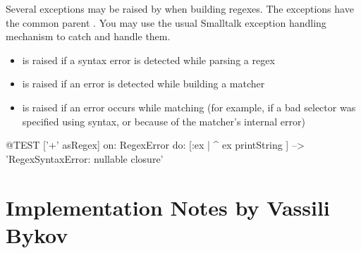 \documentclass[a4paper,10pt,twoside]{book}
\begin{document}
{Several exceptions may be raised by  when building regexes.  The exceptions have the common parent .  You may use the usual Smalltalk exception handling mechanism to catch and handle them.

\begin{itemize}

\item {} is raised if a syntax error is detected while parsing a regex

\item {} is raised if an error is detected while building a matcher

\item {} is raised if an error occurs while matching (for example, if a bad selector was specified using  syntax, or because of the matcher's internal error)



\end{itemize}


\begin{code}{@TEST}
['+' asRegex] on: RegexError do: [:ex | ^ ex printString ]                                        --> 'RegexSyntaxError:  nullable closure'
\end{code}
\section{Implementation Notes by Vassili Bykov}

}
\end{document}

